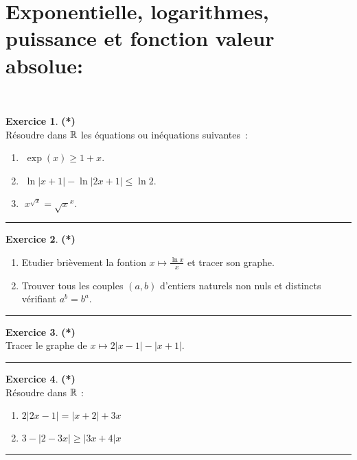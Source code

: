 \documentclass[a4paper,11pt]{article}
\theoremstyle{definition}
\newtheorem{exo}{Exercice} %
\begin{document}
\section*{Exponentielle, logarithmes, puissance et fonction valeur absolue:}\hfill\\[1cm]
\begin{minipage}{1\linewidth}
	\begin{minipage}[t]{0.48\linewidth}
		\raggedright
		
			\begin{exo}\textbf{(*)}\quad\\[0.2cm]
			Résoudre dans $\mathbb{R}$ les équations ou inéquations suivantes~:
			\begin{enumerate}
				\item $\; \exp(x) \geq 1 +x$.
				\item $\;\ln|x+1|-\ln|2x+1|\leq\ln2$.
				\item $\;x^{\sqrt{x}}=\sqrt{x}^x$.
				
			\end{enumerate}
			
			\centering
			\rule{1\linewidth}{0.6pt}
		\end{exo}
	

		
		\begin{exo}\textbf{(*)}\quad\\[0.2cm]
			\begin{enumerate}
				\item  Etudier brièvement la fontion $x\mapsto\frac{\ln x}{x}$ et tracer son graphe.
				\item  Trouver tous les couples $(a,b)$ d'entiers naturels non nuls et distincts vérifiant $a^b=b^a$.
			\end{enumerate}
			
			\centering
			\rule{1\linewidth}{0.6pt}
		\end{exo}

		
	\begin{exo}\textbf{(*)}\quad\\[0.2cm]
		Tracer le graphe de $x \longmapsto 2|x - 1| - |x + 1|$.
		
		\centering
		\rule{1\linewidth}{0.6pt}
	\end{exo}

	\begin{exo}\textbf{(*)}\quad\\[0.2cm]
	Résoudre dans $\mathbb{R}$ :
	\begin{enumerate}
		\item $2|2x-1| = |x+2|+3x$
		\item $3-|2-3x| \geq |3x+4|x$
	\end{enumerate}
	\centering
	\rule{1\linewidth}{0.6pt}
\end{exo}
	

\end{minipage}
\end{minipage}
\end{document}

